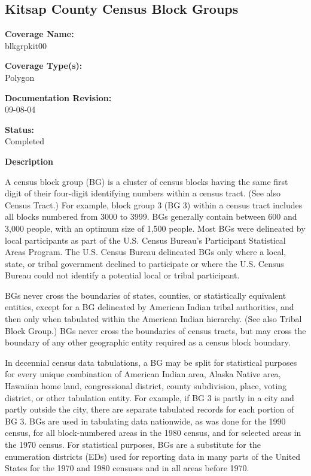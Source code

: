 \begin{landscape}
\begin{longtable}{llrrrrrc}

\end{longtable}
\end{landscape}
\newpage

\subsection{Kitsap County Census Block Groups}
{\bf \large Coverage Name:}\\
blkgrpkit00

{\bf \large Coverage Type(s):}\\
Polygon

{\bf \large Documentation Revision:}\\
09-08-04

{\bf \large Status:}\\
Completed

{\bf \large Description}

A census block group (BG) is a cluster of census blocks having the
same first digit of their four-digit identifying numbers within a
census tract. (See also Census Tract.) For example, block group 3
(BG 3) within a census tract includes all blocks numbered from
3000 to 3999. BGs generally contain between 600 and 3,000 people,
with an optimum size of 1,500 people. Most BGs were delineated by
local participants as part of the U.S. Census Bureau's Participant
Statistical Areas Program. The U.S. Census Bureau delineated BGs
only where a local, state, or tribal government declined to
participate or where the U.S. Census Bureau could not identify a
potential local or tribal participant.

BGs never cross the boundaries of states, counties, or
statistically equivalent entities, except for a BG delineated by
American Indian tribal authorities, and then only when tabulated
within the American Indian hierarchy. (See also Tribal Block
Group.) BGs never cross the boundaries of census tracts, but may
cross the boundary of any other geographic entity required as a
census block boundary.

In decennial census data tabulations, a BG may be split for
statistical purposes for every unique combination of American
Indian area, Alaska Native area, Hawaiian home land, congressional
district, county subdivision, place, voting district, or other
tabulation entity. For example, if BG 3 is partly in a city and
partly outside the city, there are separate tabulated records for
each portion of BG 3. BGs are used in tabulating data nationwide,
as was done for the 1990 census, for all block-numbered areas in
the 1980 census, and for selected areas in the 1970 census. For
statistical purposes, BGs are a substitute for the enumeration
districts (EDs) used for reporting data in many parts of the
United States for the 1970 and 1980 censuses and in all areas
before 1970.

